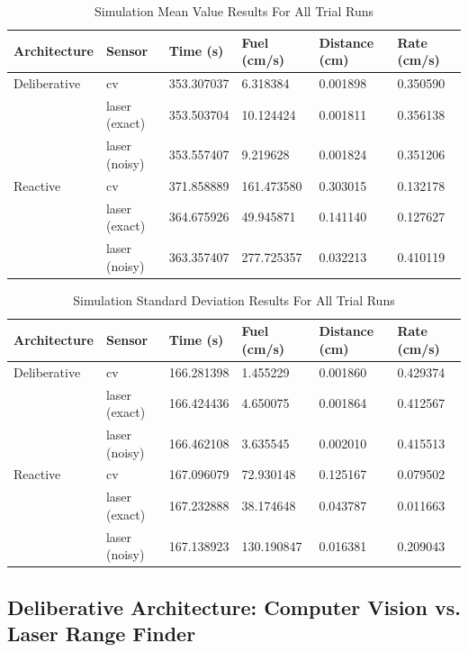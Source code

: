 \documentclass[journal, 10pt]{IEEEtran}
\begin{document}
\begin{table}
\centering
\normalsize
\caption{Simulation Mean Value Results For All Trial Runs}
\begin{tabular}{llllll}
\toprule
Architecture & Sensor & Time (s) & Fuel (cm/s) & Distance (cm) & Rate (cm/s) \\
\midrule
Deliberative & cv & 353.307037  & 6.318384 & 0.001898 & 0.350590\\
			& laser (exact) & 353.503704 & 10.124424 & 0.001811 & 0.356138\\
			& laser (noisy) & 353.557407   & 9.219628 & 0.001824 & 0.351206\\
Reactive & cv & 371.858889  & 161.473580 & 0.303015 & 0.132178\\
& laser (exact) & 364.675926 & 49.945871 & 0.141140 & 0.127627\\
& laser (noisy) &  363.357407 & 277.725357 & 0.032213 & 0.410119 \\

\bottomrule
\end{tabular}
\label{mean}
\end{table}

\begin{table}
\centering
\normalsize
\caption{Simulation Standard Deviation Results For All Trial Runs}
\begin{tabular}{llllll}
\toprule
Architecture & Sensor & Time (s) & Fuel (cm/s) & Distance (cm) & Rate (cm/s)\\
\midrule
Deliberative & cv & 166.281398 &  1.455229 & 0.001860 & 0.429374\\
			& laser (exact) & 166.424436 & 4.650075 & 0.001864 & 0.412567\\			
& laser (noisy) & 166.462108 &  3.635545 & 0.002010 & 0.415513\\
Reactive & cv & 167.096079 & 72.930148 & 0.125167 & 0.079502\\
& laser (exact) & 167.232888 & 38.174648 & 0.043787 & 0.011663 \\
& laser (noisy) & 167.138923 & 130.190847 & 0.016381 & 0.209043 \\
\bottomrule
\end{tabular}
\label{std_dev}
\end{table}

 


\subsection{Deliberative Architecture: Computer Vision vs. Laser Range Finder}
\end{document}
